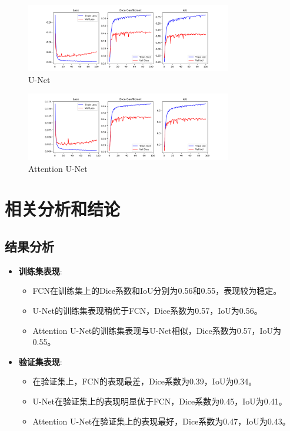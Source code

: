 \documentclass[a4paper,12pt]{report}
\begin{document}
\begin{figure}[H]
    \centering
    \includegraphics[width=0.8\textwidth]{figure/UNettraining_metrics_epochs_100.png}
    \caption{U-Net}
    \label{fig:login}
\end{figure}

\begin{figure}[H]
    \centering
    \includegraphics[width=0.8\textwidth]{figure/AttU_Net_training_metrics_epochs_96.png}
    \caption{Attention U-Net}
    \label{fig:login}
\end{figure}

\section{相关分析和结论}

\subsection{结果分析}
\begin{itemize}
    \item \textbf{训练集表现}:
        \begin{itemize}
            \item FCN在训练集上的Dice系数和IoU分别为0.56和0.55，表现较为稳定。
            \item U-Net的训练集表现稍优于FCN，Dice系数为0.57，IoU为0.56。
            \item Attention U-Net的训练集表现与U-Net相似，Dice系数为0.57，IoU为0.55。
        \end{itemize}
    \item \textbf{验证集表现}:
        \begin{itemize}
            \item 在验证集上，FCN的表现最差，Dice系数为0.39，IoU为0.34。
            \item U-Net在验证集上的表现明显优于FCN，Dice系数为0.45，IoU为0.41。
            \item Attention U-Net在验证集上的表现最好，Dice系数为0.47，IoU为0.43。
        \end{itemize}
\end{itemize}
\end{document}
